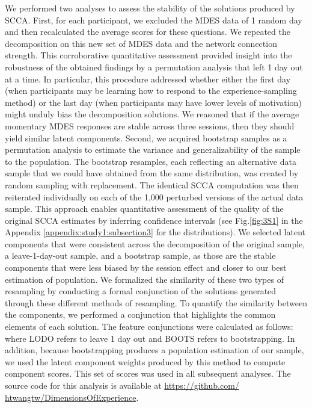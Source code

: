We performed two analyses to assess the stability of the solutions produced by SCCA. First, for each participant, we excluded the MDES data of 1 random day and then recalculated the average scores for these questions. We repeated the decomposition on this new set of MDES data and the network connection strength. This corroborative quantitative assessment provided insight into the robustness of the obtained findings by a permutation analysis that left 1 day out at a time. In particular, this procedure addressed whether either the first day (when participants may be learning how to respond to the experience-sampling method) or the last day (when participants may have lower levels of motivation) might unduly bias the decomposition solutions. We reasoned that if the average momentary MDES responses are stable across three sessions, then they should yield similar latent components. Second, we acquired bootstrap samples as a permutation analysis to estimate the variance and generalizability of the sample to the population. The bootstrap resamples, each reflecting an alternative data sample that we could have obtained from the same distribution, was created by random sampling with replacement. The identical SCCA computation was then reiterated individually on each of the 1,000 perturbed versions of the actual data sample. This approach enables quantitative assessment of the quality of the original SCCA estimates by inferring confidence intervals (see Fig.\ref{fig:3S1} in the Appendix \ref{appendix:study1:subsection3} for the distributions). We selected latent components that were consistent across the decomposition of the original sample, a leave-1-day-out sample, and a bootstrap sample, as those are the stable components that were less biased by the session effect and closer to our best estimation of population. We formalized the similarity of these two types of resampling by conducting a formal conjunction of the solutions generated through these different methods of resampling. To quantify the similarity between the components, we performed a conjunction that highlights the common elements of each solution. The feature conjunctions were calculated as follows:
where LODO refers to leave 1 day out and BOOTS refers to bootstrapping. In addition, because bootstrapping produces a population estimation of our sample, we used the latent component weights produced by this method to compute component scores. This set of scores was used in all subsequent analyses. The source code for this analysis is available at \url{https://github.com/ htwangtw/DimensionsOfExperience}.

